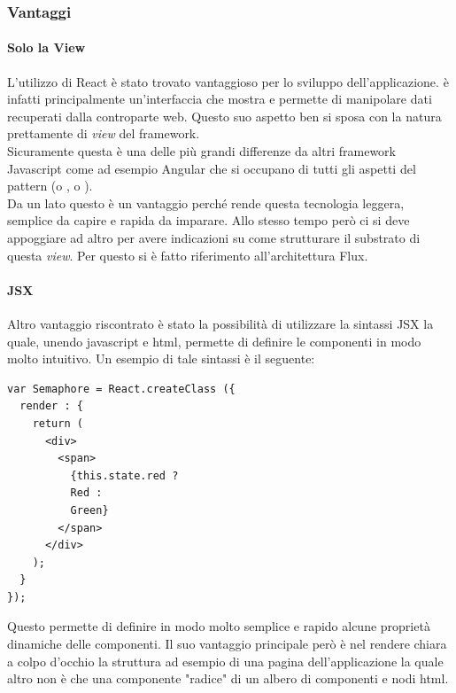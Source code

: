 \subsubsection{Vantaggi}

\paragraph{Solo la View}\label{just-the-view}
L'utilizzo di React è stato trovato vantaggioso per lo sviluppo dell'applicazione.
\fiscoloMobile{} è infatti principalmente un'interfaccia che mostra e permette di
manipolare dati recuperati dalla controparte web. Questo suo aspetto ben si sposa
con la natura prettamente di \textit{view} del framework. \\

Sicuramente questa è una delle più grandi differenze da altri framework Javascript
come ad esempio Angular che si occupano di tutti gli aspetti del pattern 
(o , o ). \\

Da un lato questo è un vantaggio perché rende questa tecnologia leggera, semplice da
capire e rapida da imparare. Allo stesso tempo però ci si deve appoggiare ad altro
per avere indicazioni su come strutturare il substrato di questa \textit{view}. Per
questo si è fatto riferimento all'architettura Flux. \\

\paragraph{JSX}
Altro vantaggio riscontrato è stato la possibilità di utilizzare la sintassi JSX
la quale, unendo javascript e html, permette di definire le componenti in modo molto
intuitivo. Un esempio di tale sintassi è il seguente:

\begin{verbatim}
var Semaphore = React.createClass ({
  render : {
    return (
      <div>
        <span>
          {this.state.red ?
          Red :
          Green}
        </span>
      </div>	
    );
  }
});
\end{verbatim}

Questo permette di definire in modo molto semplice e rapido alcune proprietà dinamiche
delle componenti. Il suo vantaggio principale però è nel rendere chiara a colpo d'occhio
la struttura ad esempio di una pagina dell'applicazione la quale altro non è che una
componente "radice" di un albero di componenti e nodi html.

